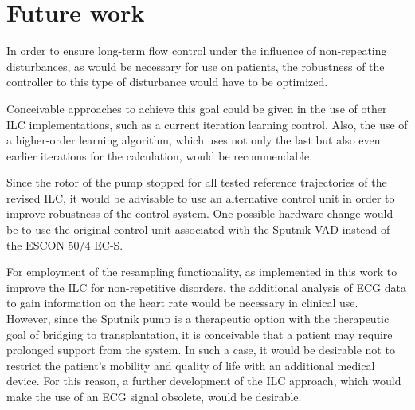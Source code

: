 \section{Future work}
In order to ensure long-term flow control under the influence of non-repeating disturbances, as would be necessary for use on patients, the robustness of the controller to this type of disturbance would have to be optimized.

Conceivable approaches to achieve this goal could be given in the use of other ILC implementations, such as a current iteration learning control. Also, the use of a higher-order learning algorithm, which uses not only the last but also even earlier iterations for the calculation, would be recommendable.

Since the rotor of the pump stopped for all tested reference trajectories of the revised ILC, it would be advisable to use an alternative control unit in order to improve robustness of the control system. One possible hardware change would be to use the original control unit associated with the Sputnik VAD instead of the ESCON 50/4 EC-S.

For employment of the resampling functionality, as implemented in this work to improve the ILC for non-repetitive disorders, the additional analysis of ECG data to gain information on the heart rate would be necessary in clinical use.
\\However, since the Sputnik pump is a therapeutic option with the therapeutic goal of bridging to transplantation, it is conceivable that a patient may require prolonged support from the system. In such a case, it would be desirable not to restrict the patient's mobility and quality of life with an additional medical device. For this reason, a further development of the ILC approach, which would make the use of an ECG signal obsolete, would be desirable.
